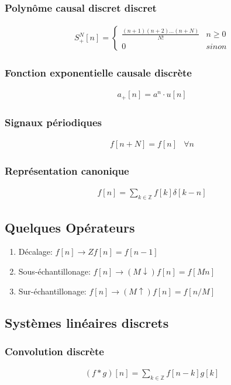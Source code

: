 \documentclass[a4paper]{amsart}
\begin{document}
\subsubsection{Polynôme causal discret discret}
\begin{eqnarray}
	S_+^N[n]=\begin{cases}
		\frac{(n+1)(n+2)\dots(n+N)}{N!} & n\geq0\\
		0 & sinon
	\end{cases}
\end{eqnarray}

\subsubsection{Fonction exponentielle causale discrète}
\begin{eqnarray}
	a_+[n]=a^n\cdot u[n]
\end{eqnarray}
\subsubsection{Signaux périodiques}
\begin{eqnarray}
	f[n+N]=f[n]&\forall n
\end{eqnarray}

\subsubsection{Représentation canonique}
\begin{eqnarray}
	f[n]=\sum_{k\in\mathbb Z}f[k]\delta[k-n]
\end{eqnarray}
\subsection{Quelques Opérateurs}
\begin{enumerate}
	\item Décalage: $f[n]\rightarrow Zf[n]=f[n-1]$
	\item Sous-échantillonage: $f[n]\rightarrow (M\downarrow)f[n]=f[Mn]$
	\item Sur-échantillonage: $f[n]\rightarrow (M\uparrow)f[n]=f[n/M]$
\end{enumerate}

\subsection{Systèmes linéaires discrets}
\subsubsection{Convolution discrète}
\begin{eqnarray}
	(f*g)[n]=\sum_{k\in\mathbb Z}f[n-k]g[k]
\end{eqnarray}
\end{document}

